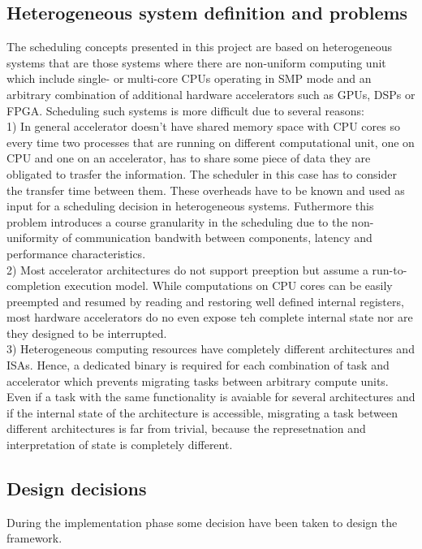 \documentclass[a4paper,13pt]{article}
\begin{document}
\begin{multicols}{2}
\subsection{Heterogeneous system definition and problems}
The scheduling concepts presented in this project are based on heterogeneous systems that are 
those systems where there are non-uniform  computing unit which include single- or multi-core CPUs
operating in SMP mode and an arbitrary combination of additional hardware accelerators such as GPUs,
DSPs or FPGA.
Scheduling such systems is more difficult due to several reasons:\\
1) In general accelerator doesn't have shared memory space with CPU cores so every time two processes 
that are running on different computational unit, one on CPU and one on an accelerator, has to share
some piece of data they are obligated to trasfer the information. The scheduler in this case has to 
consider the transfer time between them. These overheads have to be known and used as input for a
scheduling decision in heterogeneous systems. Futhermore this problem introduces a course granularity 
in the scheduling due to the non-uniformity of communication bandwith between components, latency and
performance characteristics.\\
2) Most accelerator architectures do not support preeption but assume a run-to-completion execution
model. While computations on CPU cores can be easily preempted and resumed by reading and restoring
well defined internal registers, most hardware accelerators do no even expose teh complete internal
state nor are they designed to be interrupted.\\
3) Heterogeneous computing resources have completely different architectures and ISAs. Hence, 
a dedicated binary is required for each combination of task and accelerator which prevents migrating 
tasks between arbitrary compute units. Even if a task with the same functionality is avaiable for
several architectures and if the internal state of the architecture is accessible, misgrating a task
between different architectures is far from trivial, because the represetnation and interpretation of 
state is completely different.

\subsection{Design decisions}
During the implementation phase some decision have been taken to design the framework. \\


\end{multicols}
\end{document}
